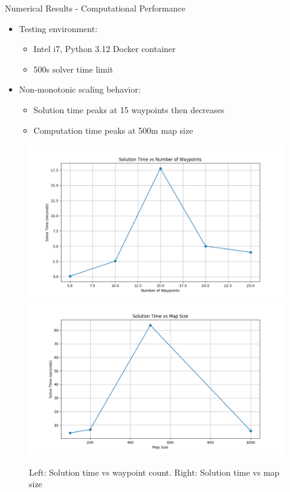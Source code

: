 \documentclass[11pt,xcolor={dvipsnames},hyperref={pdftex,pdfpagemode=UseNone,hidelinks,pdfdisplaydoctitle=true},usepdftitle=false]{beamer}
\begin{document}
    \begin{frame}{Numerical Results - Computational Performance}
      \begin{itemize}
        \item Testing environment: 
          \begin{itemize}
            \item Intel i7, Python 3.12 Docker container
            \item 500s solver time limit
          \end{itemize}
        \item Non-monotonic scaling behavior:
          \begin{itemize}
            \item Solution time peaks at 15 waypoints then decreases
            \item Computation time peaks at 500m map size
          \end{itemize}
      \end{itemize}
      
      \begin{figure}
        \centering
        \includegraphics[width=0.48\linewidth]{figures/waypoints_vs_time.pdf}
        \includegraphics[width=0.48\linewidth]{figures/map_size_vs_time.pdf}
        \caption{Left: Solution time vs waypoint count. Right: Solution time vs map size}
      \end{figure}
    \end{frame}
\end{document}
